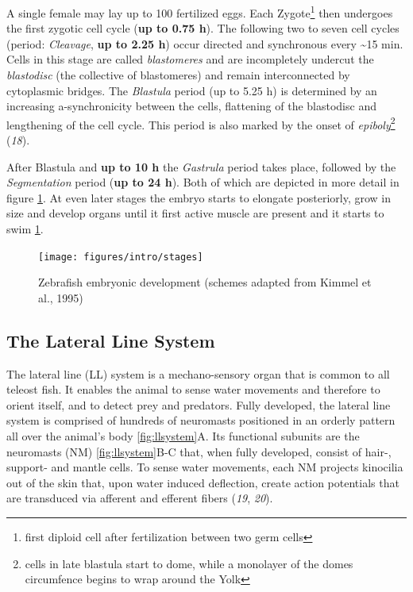 \documentclass[11pt,singlespacinge,twoside]{reedthesis} %
\begin{document}
A single female may lay up to 100 fertilized eggs. Each Zygote\footnote{first diploid cell after fertilization between two germ cells} then undergoes the first zygotic cell cycle (\textbf{up to 0.75 h}). The following two to seven cell cycles (period: \emph{Cleavage}, \textbf{up to 2.25 h}) occur directed and synchronous every \textasciitilde{}15 min. Cells in this stage are called \emph{blastomeres} and are incompletely undercut the \emph{blastodisc} (the collective of blastomeres) and remain interconnected by cytoplasmic bridges. The \emph{Blastula} period (up to 5.25 h) is determined by an increasing a-synchronicity between the cells, flattening of the blastodisc and lengthening of the cell cycle. This period is also marked by the onset of \emph{epiboly}\footnote{cells in late blastula start to dome, while a monolayer of the domes circumfence begins to wrap around the Yolk} (\emph{18}).

After Blastula and \textbf{up to 10 h} the \emph{Gastrula} period takes place, followed by the \emph{Segmentation} period (\textbf{up to 24 h}). Both of which are depicted in more detail in figure \ref{fig:stages}. At even later stages the embryo starts to elongate posteriorly, grow in size and develop organs until it first active muscle are present and it starts to swim \ref{fig:stages}.


\begin{figure}

{\centering \texttt{[image: figures/intro/stages]} 

}

\caption[Zebrafish embryonic development]{Zebrafish embryonic development (schemes adapted from Kimmel et al., 1995)}\label{fig:stages}
\end{figure}
\hypertarget{the-lateral-line-system}{%
\subsection{The Lateral Line System}\label{the-lateral-line-system}}

The lateral line (LL) system is a mechano-sensory organ that is common to all teleost fish. It enables the animal to sense water movements and therefore to orient itself, and to detect prey and predators. Fully developed, the lateral line system is comprised of hundreds of neuromasts positioned in an orderly pattern all over the animal's body \ref{fig:llsystem}A. Its functional subunits are the neuromasts (NM) \ref{fig:llsystem}B-C that, when fully developed, consist of hair-, support- and mantle cells. To sense water movements, each NM projects kinocilia out of the skin that, upon water induced deflection, create action potentials that are transduced via afferent and efferent fibers (\emph{19}, \emph{20}).
\end{document}
